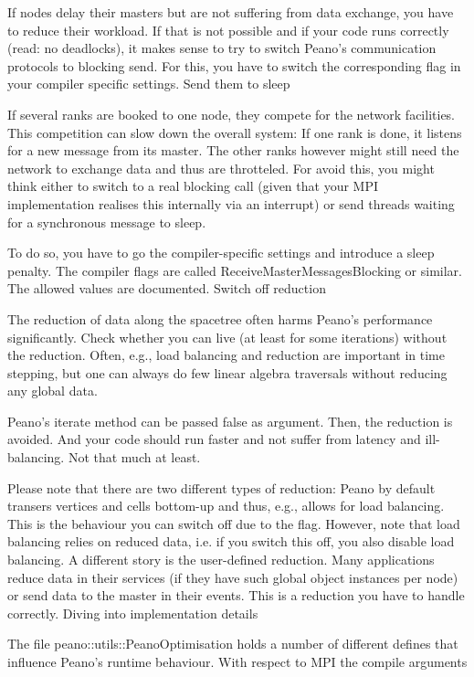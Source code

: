 If nodes delay their masters but are not suffering from data exchange, you have to reduce their workload. If that is not possible and if your code runs correctly (read: no deadlocks), it makes sense to try to switch Peano's communication protocols to blocking send. For this, you have to switch the corresponding flag in your compiler specific settings.
Send them to sleep

If several ranks are booked to one node, they compete for the network facilities. This competition can slow down the overall system: If one rank is done, it listens for a new message from its master. The other ranks however might still need the network to exchange data and thus are throtteled. For avoid this, you might think either to switch to a real blocking call (given that your MPI implementation realises this internally via an interrupt) or send threads waiting for a synchronous message to sleep.

To do so, you have to go the compiler-specific settings and introduce a sleep penalty. The compiler flags are called ReceiveMasterMessagesBlocking or similar. The allowed values are documented.
Switch off reduction

The reduction of data along the spacetree often harms Peano's performance significantly. Check whether you can live (at least for some iterations) without the reduction. Often, e.g., load balancing and reduction are important in time stepping, but one can always do few linear algebra traversals without reducing any global data.

Peano's iterate method can be passed false as argument. Then, the reduction is avoided. And your code should run faster and not suffer from latency and ill-balancing. Not that much at least.

Please note that there are two different types of reduction: Peano by default transers vertices and cells bottom-up and thus, e.g., allows for load balancing. This is the behaviour you can switch off due to the flag. However, note that load balancing relies on reduced data, i.e. if you switch this off, you also disable load balancing. A different story is the user-defined reduction. Many applications reduce data in their services (if they have such global object instances per node) or send data to the master in their events. This is a reduction you have to handle correctly.
Diving into implementation details

The file peano::utils::PeanoOptimisation holds a number of different defines that influence Peano's runtime behaviour. With respect to MPI the compile arguments

